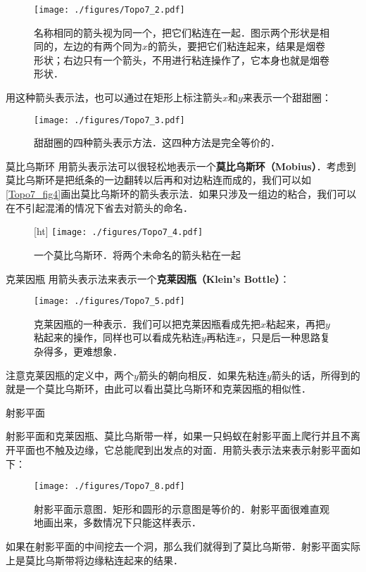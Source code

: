 \begin{figure}[ht]
\centering
\texttt{[image: ./figures/Topo7\_2.pdf]}
\caption{名称相同的箭头视为同一个，把它们粘连在一起．图示两个形状是相同的，左边的有两个同为$x$的箭头，要把它们粘连起来，结果是烟卷形状；右边只有一个箭头，不用进行粘连操作了，它本身也就是烟卷形状．} \label{Topo7_fig2}
\end{figure}

用这种箭头表示法，也可以通过在矩形上标注箭头$x$和$y$来表示一个甜甜圈：

\begin{figure}[ht]
\centering
\texttt{[image: ./figures/Topo7\_3.pdf]}
\caption{甜甜圈的四种箭头表示方法．这四种方法是完全等价的．} \label{Topo7_fig3}
\end{figure}

\begin{example}{莫比乌斯环}
用箭头表示法可以很轻松地表示一个\textbf{莫比乌斯环（Mobius）}．考虑到莫比乌斯环是把纸条的一边翻转以后再和对边粘连而成的，我们可以如\autoref{Topo7_fig4}画出莫比乌斯环的箭头表示法．如果只涉及一组边的粘合，我们可以在不引起混淆的情况下省去对箭头的命名．

\begin{figure}\label{Topo7_fig6}[ht]
\centering
\texttt{[image: ./figures/Topo7\_4.pdf]}
\caption{一个莫比乌斯环．将两个未命名的箭头粘在一起} \label{Topo7_fig4}
\end{figure}

\end{example}



\begin{example}{克莱因瓶}
用箭头表示法来表示一个\textbf{克莱因瓶（Klein's Bottle）}：
\begin{figure}[ht]
\centering
\texttt{[image: ./figures/Topo7\_5.pdf]}
\caption{克莱因瓶的一种表示．我们可以把克莱因瓶看成先把$x$粘起来，再把$y$粘起来的操作，同样也可以看成先粘连$y$再粘连$x$，只是后一种思路复杂得多，更难想象．} \label{Topo7_fig5}
\end{figure}

注意克莱因瓶的定义中，两个$y$箭头的朝向相反．如果先粘连$y$箭头的话，所得到的就是一个莫比乌斯环，由此可以看出莫比乌斯环和克莱因瓶的相似性．

\end{example}

\begin{example}{射影平面}

射影平面和克莱因瓶、莫比乌斯带一样，如果一只蚂蚁在射影平面上爬行并且不离开平面也不触及边缘，它总能爬到出发点的对面．用箭头表示法来表示射影平面如下：

\begin{figure}[ht]
\centering
\texttt{[image: ./figures/Topo7\_8.pdf]}
\caption{射影平面示意图．矩形和圆形的示意图是等价的．射影平面很难直观地画出来，多数情况下只能这样表示．} \label{Topo7_fig8}
\end{figure}

如果在射影平面的中间挖去一个洞，那么我们就得到了莫比乌斯带．射影平面实际上是莫比乌斯带将边缘粘连起来的结果．

\end{example}


